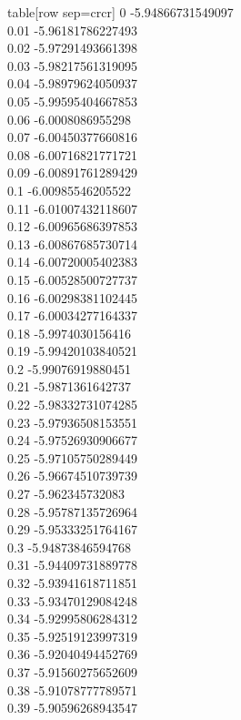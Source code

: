   table[row sep=crcr]{%
0	-5.94866731549097\\
0.01	-5.96181786227493\\
0.02	-5.97291493661398\\
0.03	-5.98217561319095\\
0.04	-5.98979624050937\\
0.05	-5.99595404667853\\
0.06	-6.0008086955298\\
0.07	-6.00450377660816\\
0.08	-6.00716821771721\\
0.09	-6.00891761289429\\
0.1	-6.00985546205522\\
0.11	-6.01007432118607\\
0.12	-6.00965686397853\\
0.13	-6.00867685730714\\
0.14	-6.00720005402383\\
0.15	-6.00528500727737\\
0.16	-6.00298381102445\\
0.17	-6.00034277164337\\
0.18	-5.9974030156416\\
0.19	-5.99420103840521\\
0.2	-5.99076919880451\\
0.21	-5.9871361642737\\
0.22	-5.98332731074285\\
0.23	-5.97936508153551\\
0.24	-5.97526930906677\\
0.25	-5.97105750289449\\
0.26	-5.96674510739739\\
0.27	-5.962345732083\\
0.28	-5.95787135726964\\
0.29	-5.95333251764167\\
0.3	-5.94873846594768\\
0.31	-5.94409731889778\\
0.32	-5.93941618711851\\
0.33	-5.93470129084248\\
0.34	-5.92995806284312\\
0.35	-5.92519123997319\\
0.36	-5.92040494452769\\
0.37	-5.91560275652609\\
0.38	-5.91078777789571\\
0.39	-5.90596268943547\\
}

